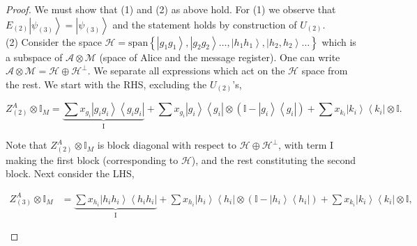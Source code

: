 \documentclass{article}
\begin{document}
\begin{enumerate}
        \begin{proof}
          We must show that (1) and (2) as above hold. For (1)  we observe that $E_{(2)}\left|\psi_{(3)}\right\rangle =\left|\psi_{(3)}\right\rangle $ and
          the statement holds by construction of $U_{(2)}$.\\
          (2) Consider the space $\mathcal{H}=\text{span}\left\{ \left|g_{1}g_{1}\right\rangle ,\left|g_{2}g_{2}\right\rangle \dots,\left|h_{1}h_{1}\right\rangle ,\left|h_{2},h_{2}\right\rangle \dots\right\} $ which is a subspace of $\mathcal{A}\otimes\mathcal{M}$ (space of Alice and the message register). One can write $\mathcal{A}\otimes \mathcal{M}=\mathcal{H} \oplus \mathcal{H}^{\perp}$. %
          We separate all expressions which act on the $\mathcal{H}$
          space from the rest. We start with the RHS,
          excluding the $U_{(2)}$'s,
          \begin{small}
            \begin{displaymath}
              Z_{(2)}^{A}\otimes\mathbb{I}_{M}=\underbrace{\sum x_{g_{i}}\left|g_{i}g_{i}\right\rangle \left\langle g_{i}g_{i}\right|}_{\text{I}}+\sum x_{g_{i}}\left|g_{i}\right\rangle \left\langle g_{i}\right|\otimes\left(\mathbb{I}-\left|g_{i}\right\rangle \left\langle g_{i}\right|\right)+\sum x_{k_{i}}\left|k_{i}\right\rangle \left\langle k_{i}\right|\otimes\mathbb{I}.
            \end{displaymath}
          \end{small}
          Note that $Z_{(2)}^{A}\otimes\mathbb{I}_{M}$ is block diagonal with respect to $\mathcal{H} \oplus \mathcal{H}^{\perp}$, with term I making the first block (corresponding to $\mathcal{H}$), and the rest constituting the second block.
          Next consider the LHS,
          \begin{footnotesize}
            \begin{align*}
              Z_{(3)}^{A}\otimes\mathbb{I}_{M} & =\underbrace{\sum x_{h_{i}}\left|h_{i}h_{i}\right\rangle \left\langle h_{i}h_{i}\right|}_{\text{I}}+\sum x_{h_{i}}\left|h_{i}\right\rangle \left\langle h_{i}\right|\otimes\left(\mathbb{I}-\left|h_{i}\right\rangle \left\langle h_{i}\right|\right)+\sum x_{k_{i}}\left|k_{i}\right\rangle \left\langle k_{i}\right|\otimes\mathbb{I},
            \end{align*}
          \end{footnotesize}


\end{proof}
\end{enumerate}
\end{document}
